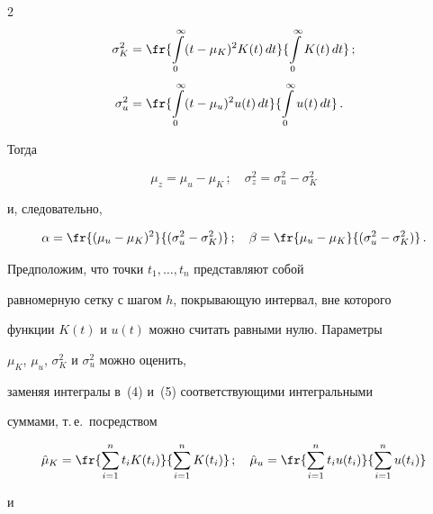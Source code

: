 \begin{multicols}{2}
\begin{align}
\sigma_K^2&=\fr{\int\limits_0^\infty(t-\mu_K)^2K(t)\,dt}{\int\limits_0^\infty


K(t)\,dt}\,;\notag\\[-6pt]


&\label{5us}\\[-6pt]


\sigma_u^2&=\fr{\int\limits_0^\infty(t-\mu_u)^2u(t)\,dt}{\int\limits_0^\infty


u(t)\,dt}\,.\notag


\end{align} 


Тогда 


$$


\mu_z=\mu_u-\mu_K\,;\quad 


\sigma_z^2=\sigma_u^2-\sigma_K^2


$$ 


и, следовательно,


\begin{equation} %


\alpha=\fr{(\mu_u-\mu_K)^2}{(\sigma_u^2-\sigma_K^2)}\,;\quad %




\beta=\fr{\mu_u-\mu_K}{(\sigma_u^2-\sigma_K^2)}\,.


\end{equation} %


Предположим, что точки $t_1,\ldots ,t_n$ представляют собой


равномерную сетку с шагом $h$, по\-кры\-ва\-ющую интервал, вне которого


функции $K(t)$ и $u(t)$ можно считать равными нулю. Параметры


$\mu_K$, $\mu_u$, $\sigma_K^2$ и $\sigma_u^2$ можно оценить,


заменяя интегралы в~(4) и~(5) соответствующими интегральными


суммами, т.\,е.\ посредством


\begin{equation*} %


\hat\mu_K=\fr{\sum_{i=1}^nt_iK(t_i)}{\sum_{i=1}^nK(t_i)}\,;\quad


\hat\mu_u=\fr{\sum_{i=1}^nt_iu(t_i)}{\sum_{i=1}^nu(t_i)}


\end{equation*} %


и


\begin{align*}



\end{align*}
\end{multicols}
